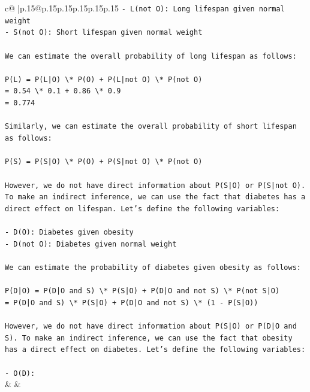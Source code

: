 \documentclass{article}
\begin{document}
{\begin{supertabular}{c@{$\;$}|p{.15\linewidth}@{}p{.15\linewidth}p{.15\linewidth}p{.15\linewidth}p{.15\linewidth}p{.15\linewidth}}
{{{\texttt{{-} L(not O): Long lifespan given normal weight} \\
\texttt{{-} S(not O): Short lifespan given normal weight} \\
\\ 
\texttt{We can estimate the overall probability of long lifespan as follows:} \\
\\ 
\texttt{P(L) = P(L|O) \textbackslash{}* P(O) + P(L|not O) \textbackslash{}* P(not O)} \\
\texttt{= 0.54 \textbackslash{}* 0.1 + 0.86 \textbackslash{}* 0.9} \\
\texttt{= 0.774} \\
\\ 
\texttt{Similarly, we can estimate the overall probability of short lifespan as follows:} \\
\\ 
\texttt{P(S) = P(S|O) \textbackslash{}* P(O) + P(S|not O) \textbackslash{}* P(not O)} \\
\\ 
\texttt{However, we do not have direct information about P(S|O) or P(S|not O). To make an indirect inference, we can use the fact that diabetes has a direct effect on lifespan. Let's define the following variables:} \\
\\ 
\texttt{{-} D(O): Diabetes given obesity} \\
\texttt{{-} D(not O): Diabetes given normal weight} \\
\\ 
\texttt{We can estimate the probability of diabetes given obesity as follows:} \\
\\ 
\texttt{P(D|O) = P(D|O and S) \textbackslash{}* P(S|O) + P(D|O and not S) \textbackslash{}* P(not S|O)} \\
\texttt{= P(D|O and S) \textbackslash{}* P(S|O) + P(D|O and not S) \textbackslash{}* (1 {-} P(S|O))} \\
\\ 
\texttt{However, we do not have direct information about P(S|O) or P(D|O and S). To make an indirect inference, we can use the fact that obesity has a direct effect on diabetes. Let's define the following variables:} \\
\\ 
\texttt{{-} O(D):} \\
            }
        }
    }
    & & \\ \\


\end{supertabular}}
\end{document}
